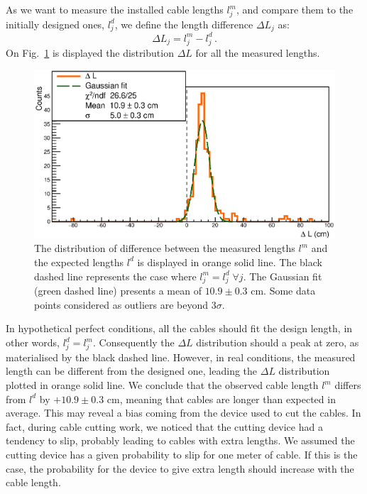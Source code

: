 As we want to measure the installed cable lengths $l^{m}_{j}$, and compare them to the initially designed ones, $l^{d}_{j}$, we define the length difference $\Delta L_{j}$ as:
\begin{equation}
  \Delta L_{j} = l^{m}_{j}-l^{d}_{j}\, .
\end{equation}
On Fig.~\ref{fig:LengthDiff} is displayed the distribution $\Delta L$ for all the measured lengths.
\begin{figure}[h]
  \centering
  \includegraphics[width=15cm]{commissioning/fig_commissioning/length_diff.eps}

  \caption{The distribution of difference between the measured lengths $l^{m}$ and the expected lengths $l^{d}$ is displayed in orange solid line.
    The black dashed line represents the case where $l^{m}_{j} = l^{d}_{j} \;\forall j$.
    The Gaussian fit (green dashed line) presents a mean of $10.9 \pm 0.3$ cm.
    Some data points considered as outliers are beyond $3\sigma$.
    \label{fig:LengthDiff}}
\end{figure}
In hypothetical perfect conditions, all the cables should fit the design length, in other words, $l^{d}_{j} = l^{m}_{j}$.
Consequently the $\Delta L$ distribution should a peak at zero, as materialised by the black dashed line.
However, in real conditions, the measured length can be different from the designed one, leading the $\Delta L$ distribution plotted in orange solid line.
We conclude that the observed cable length $l^{m}$ differs from $l^{d}$ by $+10.9\pm 0.3$ cm, meaning that cables are longer than expected in average.
This may reveal a bias coming from the device used to cut the cables.
In fact, during cable cutting work, we noticed that the cutting device had a tendency to slip, probably leading to cables with extra lengths.
We assumed the cutting device has a given probability to slip for one meter of cable.
If this is the case, the probability for the device to give extra length should increase with the cable length.

